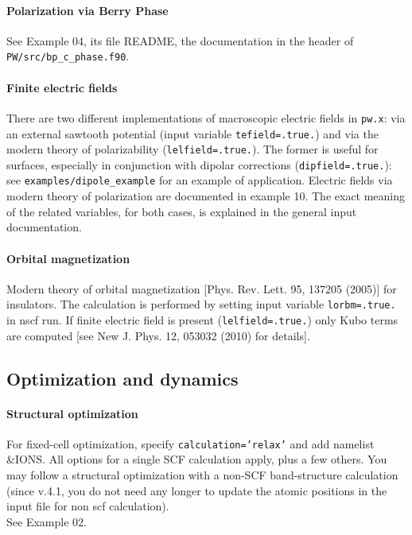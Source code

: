 \documentclass[12pt,a4paper]{article}
\def\pwx{\texttt{pw.x}}
\begin{document}
\paragraph{Polarization via Berry Phase}
See Example 04, its file README, 
the documentation in the header of 
\texttt{PW/src/bp\_c\_phase.f90}. 

\paragraph{Finite electric fields}
There are two different implementations of macroscopic electric fields
in \pwx: via an external sawtooth potential (input variable
\texttt{tefield=.true.}) and via the modern theory of polarizability
(\texttt{lelfield=.true.}).
The former is useful for surfaces, especially in conjunction
with dipolar corrections (\texttt{dipfield=.true.}):
see \texttt{examples/dipole\_example} for an example of application. 
Electric fields via modern theory of polarization are documented in
example 10. The exact meaning of the related variables, for both
cases, is explained in the general input documentation.

\paragraph{Orbital magnetization}
Modern theory of orbital magnetization [Phys. Rev. Lett. 95, 137205 (2005)]
for insulators. The calculation is performed by setting 
input variable \texttt{lorbm=.true.} in nscf run. If finite electric field 
is present (\texttt{lelfield=.true.}) only Kubo terms are computed
[see New J. Phys. 12, 053032 (2010) for details].

\subsection{Optimization and dynamics}

\paragraph{Structural optimization}
For fixed-cell optimization, specify \texttt{calculation='relax'} and 
add namelist \&IONS. All options for a single SCF calculation apply, 
plus a few others. You
may follow a structural optimization with a non-SCF band-structure
calculation (since v.4.1, you do not need any longer to update the 
atomic positions in the input file for non scf calculation).\\
See Example 02.
\end{document}
